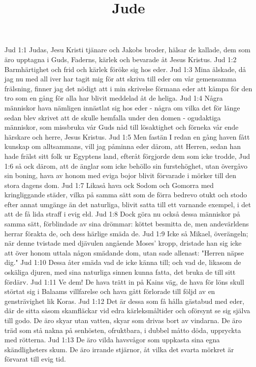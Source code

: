 

\title{Jude}

Jud 1:1  Judas, Jesu Kristi tjänare och Jakobs broder, hälsar de kallade, dem som äro upptagna i Guds, Faderns, kärlek och bevarade åt Jesus Kristus.
Jud 1:2  Barmhärtighet och frid och kärlek föröke sig hos eder.
Jud 1:3  Mina älskade, då jag nu med all iver har tagit mig för att skriva till eder om vår gemensamma frälsning, finner jag det nödigt att i min skrivelse förmana eder att kämpa för den tro som en gång för alla har blivit meddelad åt de heliga.
Jud 1:4  Några människor hava nämligen innästlat sig hos eder - några om vilka det för länge sedan blev skrivet att de skulle hemfalla under den domen - ogudaktiga människor, som missbruka vår Guds nåd till lösaktighet och förneka vår ende härskare och herre, Jesus Kristus.
Jud 1:5  Men fastän I redan en gång haven fått kunskap om alltsammans, vill jag påminna eder därom, att Herren, sedan han hade frälst sitt folk ur Egyptens land, efteråt förgjorde dem som icke trodde,
Jud 1:6  så ock därom, att de änglar som icke behöllo sin furstehöghet, utan övergåvo sin boning, hava av honom med eviga bojor blivit förvarade i mörker till den stora dagens dom.
Jud 1:7  Likaså hava ock Sodom och Gomorra med kringliggande städer, vilka på samma sätt som de förra bedrevo otukt och stodo efter annat umgänge än det naturliga, blivit satta till ett varnande exempel, i det att de få lida straff i evig eld.
Jud 1:8  Dock göra nu också dessa människor på samma sätt, förblindade av sina drömmar: köttet besmitta de, men andevärldens herrar förakta de, och dess härlige smäda de.
Jud 1:9  Icke så Mikael, överängeln; när denne tvistade med djävulen angående Moses' kropp, dristade han sig icke att över honom uttala någon smädande dom, utan sade allenast: "Herren näpse dig."
Jud 1:10  Dessa åter smäda vad de icke känna till; och vad de, likasom de oskäliga djuren, med sina naturliga sinnen kunna fatta, det bruka de till sitt fördärv.
Jud 1:11  Ve dem! De hava trätt in på Kains väg, de hava för löns skull störtat sig i Balaams villfarelse och hava gått förlorade till följd av en gensträvighet lik Koras.
Jud 1:12  Det är dessa som få hålla gästabud med eder, där de sitta såsom skamfläckar vid edra kärleksmåltider och oförsynt se sig själva till godo. De äro skyar utan vatten, skyar som drivas bort av vindarna. De äro träd som stå nakna på senhösten, ofruktbara, i dubbel måtto döda, uppryckta med rötterna.
Jud 1:13  De äro vilda havsvågor som uppkasta sina egna skändligheters skum. De äro irrande stjärnor, åt vilka det svarta mörkret är förvarat till evig tid.
